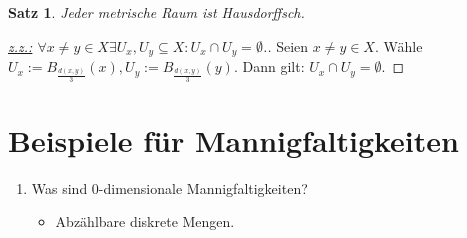 \documentclass[a4paper,11pt,notitlepage]{report}
\newtheorem{theorem}{Satz}[chapter]
\begin{document}
\begin{theorem}
Jeder metrische Raum ist Hausdorffsch.
\end{theorem}

\begin{proof}
[\underline{z.z.:} $\forall x\neq y \in X \exists U_x, U_y \subseteq X \colon U_x \cap U_y = \emptyset$.]
Seien $x\neq y \in X$. Wähle $U_x := B_\frac{d(x,y)}{3}(x), U_y := B_\frac{d(x,y)}{3}(y)$.
\newline
Dann gilt: $U_x \cap U_y = \emptyset$.
\end{proof}

\section{Beispiele für Mannigfaltigkeiten}
\begin{enumerate}
	\item Was sind 0-dimensionale Mannigfaltigkeiten?
		\begin{itemize}
			\item Abzählbare diskrete Mengen.
		\end{itemize}
		

\end{enumerate}
\end{document}
